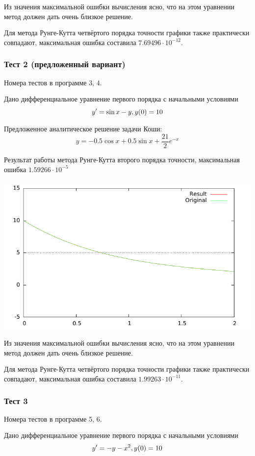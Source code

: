 \documentclass[a4paper,11pt]{report}
\begin{document}
Из значения максимальной ошибки вычисления ясно, что на этом уравнении метод должен дать очень
близкое решение.

Для метода Рунге-Кутта четвёртого порядка точности графики также практически совпадают, максимальная
ошибка составила $7.69496 \cdot 10^{-12}$.

\subsubsection{Тест 2 (предложенный вариант)}
Номера тестов в программе 3, 4.

Дано дифференциальное уравнение первого порядка с начальными условиями
$$
y' = \sin x - y, \\
y(0) = 10
$$

Предложенное аналитическое решение задачи Коши:
$$
y = -0.5 \cos x + 0.5 \sin x + \frac{21}{2}e^{-x}
$$

Результат работы метода Рунге-Кутта второго порядка точности, максимальная ошибка $1.59266 \cdot 10^{-5}$

\includegraphics{../plots/test2_rk2.pdf}

Из значения максимальной ошибки вычисления ясно, что на этом уравнении метод должен дать очень
близкое решение.

Для метода Рунге-Кутта четвёртого порядка точности графики также практически совпадают, максимальная
ошибка составила $1.99263 \cdot 10^{-11}$.

\subsubsection{Тест 3}
Номера тестов в программе 5, 6.

Дано дифференциальное уравнение первого порядка с начальными условиями
$$
y' = -y - x^2, \\
y(0) = 10
$$
\end{document}

